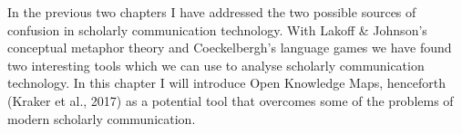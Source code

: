 In the previous two chapters I have addressed the two possible sources of confusion in scholarly communication technology. With Lakoff & Johnson’s conceptual metaphor theory and Coeckelbergh’s language games we have found two interesting tools which we can use to analyse scholarly communication technology. In this chapter I will introduce Open Knowledge Maps, henceforth  (Kraker et al., 2017) as a potential tool that overcomes some of the problems of modern scholarly communication.